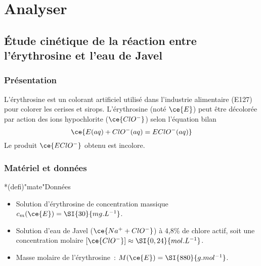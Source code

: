 \documentclass[../main/main.tex]{subfiles}
\begin{document}
\section{Analyser}
%

\subsection{Étude cinétique de la réaction entre l'érythrosine et l'eau de Javel}

\subsubsection{Présentation}

L'érythrosine est un colorant artificiel utilisé dans l'industrie alimentaire
(E127) pour colorer les cerises et sirops. L'érythrosine (noté $\ce{E}$) peut
être décolorée par action des ions hypochlorite ($\ce{ClO^-}$) selon l’équation
bilan
\[\ce{E(aq) + ClO^-(aq) = EClO^-(aq)}\]
Le produit $\ce{EClO^-}$ obtenu est incolore.

\subsubsection{Matériel et données}

\begin{tcb}*(defi)"mate"{Données}
	\begin{itemize}
		\item Solution d'érythrosine de concentration massique $c_m (\ce{E}) =
			      \SI{30}{mg.L^{-1}}$.
		\item Solution d'eau de Javel ($\ce{Na^+ + ClO^-}$) à 4,8\% de chlore actif,
		      soit une concentration molaire $[\ce{ClO^-}] \approx
			      \SI{0,24}{mol.L^{-1}}$.
		\item Masse molaire de l'érythrosine~: $M(\ce{E}) = \SI{880}{g.mol^{-1}}$.
	\end{itemize}
\end{tcb}
\end{document}
